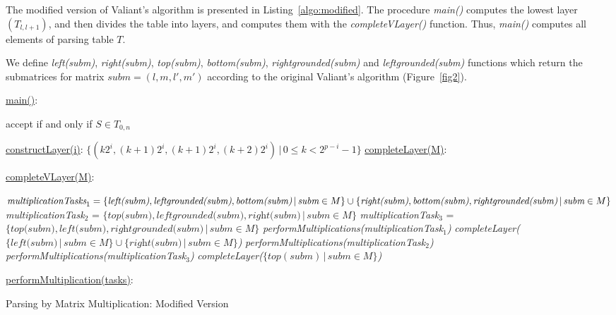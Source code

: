 The modified version of Valiant's algorithm is presented in Listing~\ref{algo:modified}.
The procedure \textit{main()} computes the lowest layer $(T_{l, l+1})$, and then divides the table into layers, and computes them with the \textit{completeVLayer()} function.
Thus, \textit{main()} computes all elements of parsing table $T$.

We define \textit{left(subm)}, \textit{right(subm)}, \textit{top(subm)}, \textit{bottom(subm)}, \linebreak \textit{rightgrounded(subm)} and \textit{leftgrounded(subm)} functions which return the submatrices for matrix $\textit{subm} = (l, m, l', m')$ according to the original Valiant's algorithm (Figure~\ref{fig2}).


\begin{algorithm}[!h]
\SetAlgoNoLine
{}
\underline{main()}{:}{

 accept if and only if $S \in T_{0, n}$
 \BlankLine
 }

\underline{constructLayer(i)}{:}{
 \BlankLine
 $\{(k2^i, (k+1)2^i, (k + 1)2^i, (k+2)2^i) \, |\, 0 \le k < 2^{p - i} - 1\}$
 \BlankLine
    }
\underline{completeLayer(M)}{:}{
\BlankLine
{}
\BlankLine
}

\underline{completeVLayer(M)}{:}{
 \BlankLine
 $\textit{multiplicationTasks}_1 = \linebreak
    \{\textit{left(subm)}, \textit{leftgrounded(subm)}, \textit{bottom(subm)}\, 
    |\,\textit{subm} \in M \} \cup \linebreak  \{\textit{right(subm)}, \textit{bottom(subm)}, \textit{rightgrounded(subm)}\, |\,\textit{subm} \in M\}$\;
 \BlankLine
 \textit{multiplicationTask$_2$} = $\{\textit{top(subm)}, \textit{leftgrounded(subm)}, \textit{right(subm)}\, |\,\textit{subm} \in M\}$\;
 \BlankLine
 \textit{multiplicationTask$_3$} = $\{\textit{top(subm)}, \textit{left(subm)}, \textit{rightgrounded(subm)}\, |\,\textit{subm} \in M\}$\;
 \BlankLine
 \textit{performMultiplications(multiplicationTask$_1$)}\;
 \textit{completeLayer($\{\textit{left(subm)}\, |\,subm \in M \} \cup \{\textit{right(subm)}\, |\,\textit{subm} \in M \}$)}\;
 \textit{performMultiplications(multiplicationTask$_2$)}\;
 \textit{performMultiplications(multiplicationTask$_3$)}\;
 \textit{completeLayer($\{top(subm)\, |\,subm \in M \}$)}

 }
 \BlankLine

 \underline{performMultiplication(tasks)}{:}{\\
 }

\caption{Parsing by Matrix Multiplication: Modified Version}
\label{algo:modified}
\end{algorithm}


